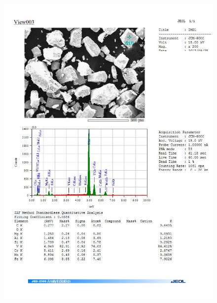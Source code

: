 \documentclass[12pt]{article}
\begin{document}
\begin{figure}[H]
	\includegraphics[width = \linewidth]{./pictures/dot_spec_10.jpg}
\end{figure}
\end{document}
